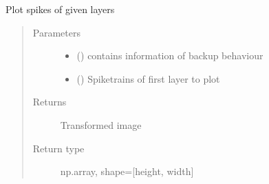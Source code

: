 \documentclass[letterpaper,10pt,english]{sphinxmanual}
\begin{document}

\begin{fulllineitems}
\label{\detokenize{SpikingConvNet:SpikingConvNet.utils.plot_membran_voltages}}
\end{fulllineitems}


\begin{fulllineitems}
\label{\detokenize{SpikingConvNet:SpikingConvNet.utils.plot_spike_activity}}
\end{fulllineitems}


\begin{fulllineitems}
\label{\detokenize{SpikingConvNet:SpikingConvNet.utils.plot_spikes}}
Plot spikes of given layers
\begin{quote}\begin{description}
\item[{Parameters}] \leavevmode\begin{itemize}
\item {} 
 () \textendash{} contains information of backup behaviour

\item {} 
 () \textendash{} Spiketrains of first layer to plot

\end{itemize}

\item[{Returns}] \leavevmode
{} \textendash{} Transformed image

\item[{Return type}] \leavevmode
np.array, shape={[}height, width{]}

\end{description}\end{quote}

\end{fulllineitems}
\end{document}
